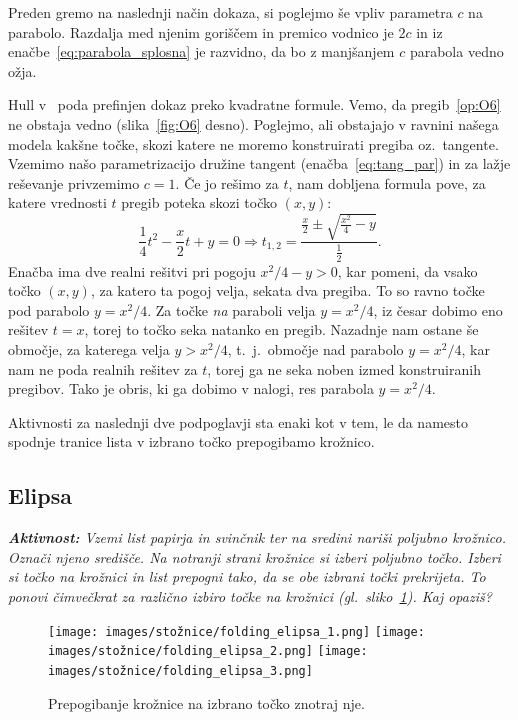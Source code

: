 Preden gremo na naslednji način dokaza, si poglejmo še vpliv parametra $c$ na parabolo. Razdalja med njenim goriščem in premico vodnico je $2c$ in iz enačbe~\ref{eq:parabola_splosna} je razvidno, da bo z manjšanjem $c$ parabola vedno ožja.

Hull v~\cite[str.\ 55--56]{hull2013} poda prefinjen dokaz preko kvadratne formule. Vemo, da pregib~\ref{op:O6} ne obstaja vedno (slika~\ref{fig:O6} desno). Poglejmo, ali obstajajo v ravnini našega modela kakšne točke, skozi katere ne moremo konstruirati pregiba oz.\ tangente. Vzemimo našo parametrizacijo družine tangent (enačba~\ref{eq:tang_par}) in za lažje reševanje privzemimo $c = 1$. Če jo rešimo za $t$, nam dobljena formula pove, za katere vrednosti $t$ pregib poteka skozi točko $(x, y)$:
$$ \frac{1}{4}t^2 - \frac{x}{2}t + y = 0 \Rightarrow t_{1,2} = \frac{\frac{x}{2} \pm \sqrt{\frac{x^2}{4} - y}}{\frac{1}{2}}.$$
Enačba ima dve realni rešitvi pri pogoju $x^2 / 4 - y > 0$, kar pomeni, da vsako točko $(x, y)$, za katero ta pogoj velja, sekata dva pregiba. To so ravno točke pod parabolo $y = x^2 / 4$. Za točke \emph{na} paraboli velja $y = x^2 / 4$, iz česar dobimo eno rešitev $t = x$, torej to točko seka natanko en pregib. Nazadnje nam ostane še območje, za katerega velja $y > x^2 / 4$, t.\ j.\ območje nad parabolo $y = x^2 / 4$, kar nam ne poda realnih rešitev za $t$, torej ga ne seka noben izmed konstruiranih pregibov. Tako je obris, ki ga dobimo v nalogi, res parabola $y = x^2 / 4$.

Aktivnosti za naslednji dve podpoglavji sta enaki kot v tem, le da namesto spodnje tranice lista v izbrano točko prepogibamo krožnico.

\subsection{Elipsa}

\textit{\textbf{Aktivnost:} Vzemi list papirja in svinčnik ter na sredini nariši poljubno krožnico. Označi njeno središče. Na notranji strani krožnice si izberi poljubno točko. Izberi si točko na krožnici in list prepogni tako, da se obe izbrani točki prekrijeta. To ponovi čimvečkrat za različno izbiro točke na krožnici (gl.\ sliko~\ref{fig:koraki_elipsa}). Kaj opaziš?}

\begin{figure}[h]
    \centering
    \texttt{[image: images/stožnice/folding\_elipsa\_1.png]}
    \texttt{[image: images/stožnice/folding\_elipsa\_2.png]}
    \texttt{[image: images/stožnice/folding\_elipsa\_3.png]}
    \caption[Prepogibanje elipse]{Prepogibanje krožnice na izbrano točko znotraj nje.}
    \label{fig:koraki_elipsa}
\end{figure}


